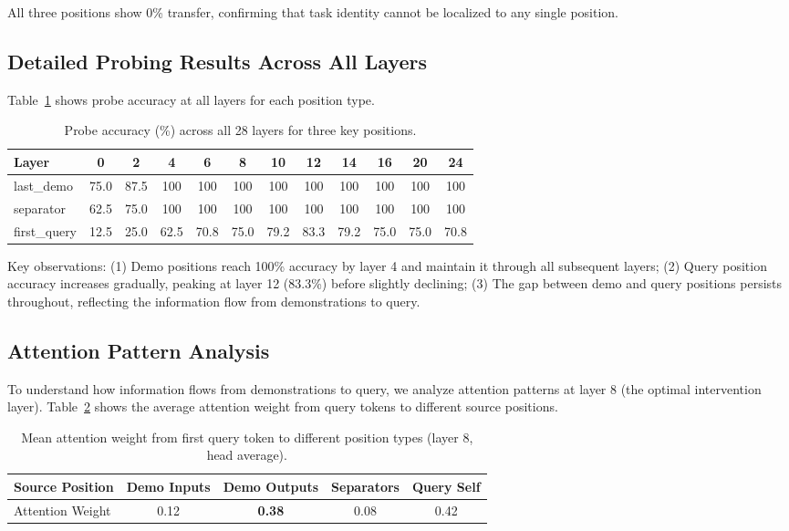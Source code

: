 \documentclass{article}
\begin{document}
All three positions show 0\% transfer, confirming that task identity cannot be localized to any single position.

\subsection{Detailed Probing Results Across All Layers}

Table~\ref{tab:full_probing} shows probe accuracy at all layers for each position type.

\begin{table}[h]
\centering
\small
\caption{Probe accuracy (\%) across all 28 layers for three key positions.}
\label{tab:full_probing}
\begin{tabular}{@{}lccccccccccc@{}}
\toprule
Layer & 0 & 2 & 4 & 6 & 8 & 10 & 12 & 14 & 16 & 20 & 24 \\
\midrule
last\_demo & 75.0 & 87.5 & 100 & 100 & 100 & 100 & 100 & 100 & 100 & 100 & 100 \\
separator & 62.5 & 75.0 & 100 & 100 & 100 & 100 & 100 & 100 & 100 & 100 & 100 \\
first\_query & 12.5 & 25.0 & 62.5 & 70.8 & 75.0 & 79.2 & 83.3 & 79.2 & 75.0 & 75.0 & 70.8 \\
\bottomrule
\end{tabular}
\end{table}

Key observations: (1) Demo positions reach 100\% accuracy by layer 4 and maintain it through all subsequent layers; (2) Query position accuracy increases gradually, peaking at layer 12 (83.3\%) before slightly declining; (3) The gap between demo and query positions persists throughout, reflecting the information flow from demonstrations to query.

\subsection{Attention Pattern Analysis}

To understand how information flows from demonstrations to query, we analyze attention patterns at layer 8 (the optimal intervention layer). Table~\ref{tab:attention} shows the average attention weight from query tokens to different source positions.

\begin{table}[h]
\centering
\small
\caption{Mean attention weight from first query token to different position types (layer 8, head average).}
\label{tab:attention}
\begin{tabular}{@{}lcccc@{}}
\toprule
Source Position & Demo Inputs & Demo Outputs & Separators & Query Self \\
\midrule
Attention Weight & 0.12 & \textbf{0.38} & 0.08 & 0.42 \\
\bottomrule
\end{tabular}
\end{table}
\end{document}
